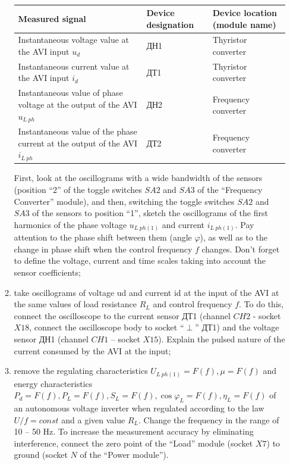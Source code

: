 \documentclass[a4paper,14pt]{article}
\begin{document}
\begin{enumerate}
\begin{enumerate}
\begin{table}[!ht]
\begin{tabular}{p{}p{}p{}}
\toprule
Measured signal& Device designation& Device location (module name)\\
\midrule
Instantaneous voltage value at the AVI input $u_d$ & ДН1 & Thyristor converter\\
\midrule
Instantaneous current value at the AVI input $i_d$ & ДТ1 & Thyristor converter\\
\midrule
Instantaneous value of phase voltage at the output of the AVI $u_{L\:ph}$ & ДН2 & Frequency converter \\
\midrule
Instantaneous value of the phase current at the output of the AVI $i_{L\:ph}$ & ДТ2 & Frequency converter 
\end{tabular}
\caption{}
\label{table:III}
\end{table}

First, look at the oscillograms with a wide bandwidth of the sensors (position “2” of the toggle switches $SA2$ and $SA3$ of the “Frequency Converter” module), and then, switching the toggle switches $SA2$ and $SA3$ of the sensors to position “1”, sketch the oscillograms of the first harmonics of the phase voltage $u_{L\:ph(1)}$ and current $i_{L\:ph(1)}$. 
Pay attention to the phase shift between them (angle $\varphi$), as well as to the change in phase shift when the control frequency $f$ changes. 
Don't forget to define the voltage, current and time scales taking into account the sensor coefficients;

\item take oscillograms of voltage ud and current id at the input of the AVI at the same values of load resistance $R_L$ and control frequency $f$. 
To do this, connect the oscilloscope to the current sensor ДТ1 (channel $CH2$ - socket $X18$, connect the oscilloscope body to socket “$\perp$” ДТ1) and the voltage sensor ДН1 (channel $CH1$ -- socket $X15$). 
Explain the pulsed nature of the current consumed by the AVI at the input;

\item remove the regulating characteristics %
 $U_{L\:ph(1)} = F(f), \mu = F(f)$ and energy characteristics $P_d = F(f), P_L = F(f), S_L = F(f),\cos\varphi_L = F(f), \eta_L = F(f)$ of an autonomous voltage inverter when regulated according to the law $U/f=const$ and a given value $R_L$. Change the frequency in the range of 10 -- 50 Hz. To increase the measurement accuracy by eliminating interference, connect the zero point of the “Load” module (socket $X7$) to ground (socket $N$ of the “Power module”).


\end{enumerate}
\end{enumerate}
\end{document}

